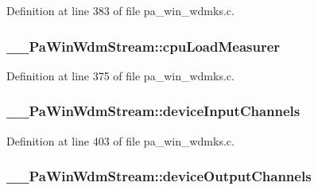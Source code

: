 Definition at line 383 of file pa\+\_\+win\+\_\+wdmks.\+c.

\subsubsection[{\texorpdfstring{cpu\+Load\+Measurer}{cpuLoadMeasurer}}]{ \+\_\+\+\_\+\+Pa\+Win\+Wdm\+Stream\+::cpu\+Load\+Measurer}\hypertarget{struct_____pa_win_wdm_stream_ad77f1764e2de9c5a9d2b05ee1a4565ee}{}\label{struct_____pa_win_wdm_stream_ad77f1764e2de9c5a9d2b05ee1a4565ee}


Definition at line 375 of file pa\+\_\+win\+\_\+wdmks.\+c.

\subsubsection[{\texorpdfstring{device\+Input\+Channels}{deviceInputChannels}}]{ \+\_\+\+\_\+\+Pa\+Win\+Wdm\+Stream\+::device\+Input\+Channels}\hypertarget{struct_____pa_win_wdm_stream_ae9c3eec995fc49fa3fadb925430b359c}{}\label{struct_____pa_win_wdm_stream_ae9c3eec995fc49fa3fadb925430b359c}


Definition at line 403 of file pa\+\_\+win\+\_\+wdmks.\+c.

\subsubsection[{\texorpdfstring{device\+Output\+Channels}{deviceOutputChannels}}]{ \+\_\+\+\_\+\+Pa\+Win\+Wdm\+Stream\+::device\+Output\+Channels}\hypertarget{struct_____pa_win_wdm_stream_aea3f97d4daebbcf1865bcce7103e5e1b}{}\label{struct_____pa_win_wdm_stream_aea3f97d4daebbcf1865bcce7103e5e1b}


